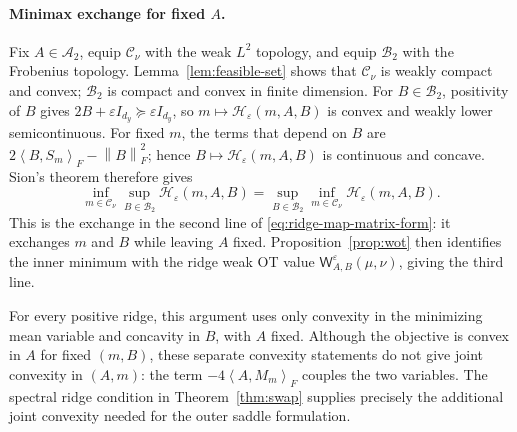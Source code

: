 \documentclass[11pt]{article}
\newcommand{\ip}[2]{\left\langle #1,#2\right\rangle}
\newcommand{\norm}[1]{\left\lVert #1\right\rVert}
\theoremstyle{plain}
\theoremstyle{definition}
\theoremstyle{remark}
\begin{document}
\paragraph{Minimax exchange for fixed \(A\).}
Fix \(A\in\mathcal A_2\), equip \(\mathcal C_\nu\) with the weak \(L^2\)
topology, and equip \(\mathcal B_2\) with the Frobenius topology.
Lemma~\ref{lem:feasible-set} shows that \(\mathcal C_\nu\) is weakly compact and
convex; \(\mathcal B_2\) is compact and convex in finite dimension. For
\(B\in\mathcal B_2\), positivity of \(B\) gives
\(2B+\varepsilon I_{d_y}\succeq\varepsilon I_{d_y}\), so
\(m\mapsto\mathcal H_\varepsilon(m,A,B)\) is convex and weakly lower
semicontinuous. For fixed \(m\), the terms that depend on \(B\) are
\(2\ip{B}{S_m}_F-\norm B_F^2\); hence
\(B\mapsto\mathcal H_\varepsilon(m,A,B)\) is continuous and concave. Sion's
theorem therefore gives
\[
 \inf_{m\in\mathcal C_\nu}\sup_{B\in\mathcal B_2}
 \mathcal H_\varepsilon(m,A,B)
 =
 \sup_{B\in\mathcal B_2}\inf_{m\in\mathcal C_\nu}
 \mathcal H_\varepsilon(m,A,B).
\]
This is the exchange in the second line of
\eqref{eq:ridge-map-matrix-form}: it exchanges \(m\) and \(B\) while leaving
\(A\) fixed. Proposition~\ref{prop:wot} then identifies the inner minimum with
the ridge weak OT value \(\mathsf W_{A,B}^{\varepsilon}(\mu,\nu)\), giving the
third line.

For every positive ridge, this argument uses only convexity in the minimizing
mean variable and concavity in \(B\), with \(A\) fixed. Although the objective is
convex in \(A\) for fixed \((m,B)\), these separate convexity statements do not
give joint convexity in \((A,m)\): the term
\(-4\ip{A}{M_m}_F\) couples the two variables. The spectral ridge condition in
Theorem~\ref{thm:swap} supplies precisely the additional joint convexity needed
for the outer saddle formulation.
\end{document}
